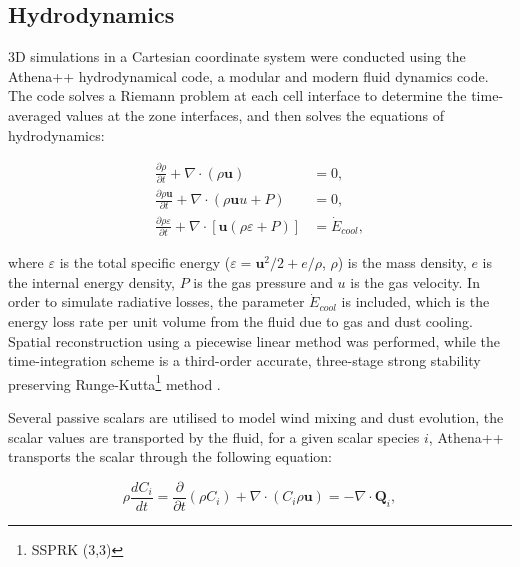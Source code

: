 
\subsection{Hydrodynamics}

3D simulations in a Cartesian coordinate system were conducted using the Athena++ hydrodynamical code, a modular and modern fluid dynamics code.
The code solves a Riemann problem at each cell interface to determine the time-averaged values at the zone interfaces, and then solves the equations of hydrodynamics:

\begin{subequations}
  \begin{align}
    \frac{\partial\rho}{\partial t}+\nabla \cdot \left(\rho \boldsymbol{u}\right) & = 0 , \\
    \frac{\partial \rho \boldsymbol{u}}{\partial t} + \nabla \cdot \left(\rho \boldsymbol{u} u + P \right) & = 0, \\
    \frac{\partial \rho \varepsilon}{\partial t} + \nabla \cdot \left[ \boldsymbol{u} \left( \rho\varepsilon + P \right) \right] & = \dot E_{cool} , 
  \end{align}
\end{subequations}

\noindent
where $\varepsilon$ is the total specific energy ($\varepsilon = \boldsymbol{u}^2/2 + e/\rho $, $\rho$) is the mass density, $e$ is the internal energy density, $P$ is the gas pressure and $u$ is the gas velocity.
In order to simulate radiative losses, the parameter $\dot E_{cool}$ is included, which is the energy loss rate per unit volume from the fluid due to gas and dust cooling.
Spatial reconstruction using a piecewise linear method was performed, while the time-integration scheme is a third-order accurate, three-stage strong stability preserving Runge-Kutta\footnote{SSPRK (3,3)} method \parencite{gottliebHighOrderStrong2009}.

Several passive scalars are utilised to model wind mixing and dust evolution, the scalar values are transported by the fluid, for a given scalar species $i$, Athena++ transports the scalar through the following equation:

\begin{equation}
  \rho \frac{dC_i}{dt} = \frac{\partial}{\partial t} \left( \rho C_i \right) + \nabla \cdot \left( C_i \rho \mathbf{u} \right) = -\nabla \cdot \mathbf{Q}_i ,  
\end{equation}

